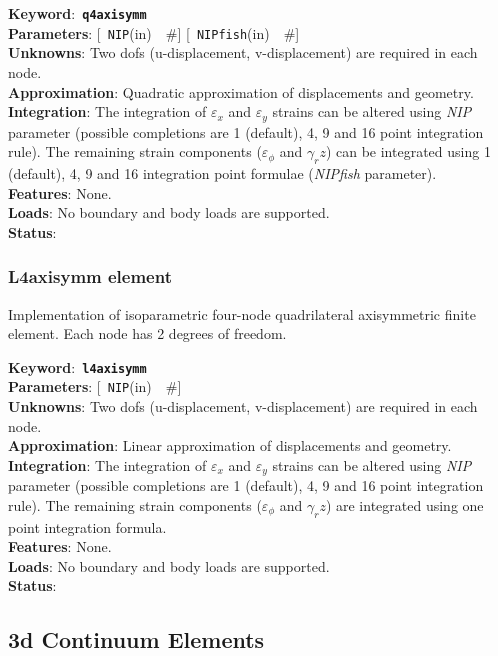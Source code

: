 \documentclass[a4paper]{article}
\newcommand{\descitem}[1]{{\noindent \bf #1}:}
\newcommand{\elemkeyword}[1]{\descitem{Keyword}~{\bf \texttt{#1}}}
\newcommand{\elemparam}[2]{{{\texttt{#1}\tiny (#2)}~~\#}}
\newcommand{\optelemparam}[2]{{[~\elemparam{#1}{#2}]}}
\newcommand{\param}[1]{{\em #1}}
\begin{document}
\elemkeyword{q4axisymm}\\
\descitem{Parameters} \optelemparam{NIP}{in} \optelemparam{NIPfish}{in}\\
\descitem{Unknowns}
Two dofs (u-displacement, v-displacement) are required in each node.\\
\descitem{Approximation} Quadratic approximation of displacements and
geometry.\\
\descitem{Integration}
The integration of $\varepsilon_x$ and $\varepsilon_y$ strains can be altered using
\param{NIP} parameter (possible completions are 1 (default), 4, 9 and 16
point integration rule). The remaining strain components ($\varepsilon_\phi$ and
$\gamma_rz$) can be integrated using 1 (default), 4, 9 and 16 integration
point formulae (\param{NIPfish} parameter).\\
\descitem{Features} None.\\
\descitem{Loads} No boundary and body loads are supported.\\
\descitem{Status} 

\subsubsection{L4axisymm element}
Implementation of isoparametric four-node quadrilateral axisymmetric
finite element. Each node has 2 degrees of freedom.

\elemkeyword{l4axisymm}\\
\descitem{Parameters} \optelemparam{NIP}{in}\\
\descitem{Unknowns}
Two dofs (u-displacement, v-displacement) are required in each node.\\
\descitem{Approximation} Linear approximation of displacements and
geometry.\\
\descitem{Integration}
The integration of $\varepsilon_x$ and $\varepsilon_y$ strains can be altered using
\param{NIP} parameter (possible completions are 1 (default), 4, 9 and 16
point integration rule). The remaining strain components ($\varepsilon_\phi$ and
$\gamma_rz$) are integrated using one point integration formula.\\
\descitem{Features} None.\\
\descitem{Loads} No boundary and body loads are supported.\\
\descitem{Status} 

\subsection{3d Continuum Elements}
\end{document}
